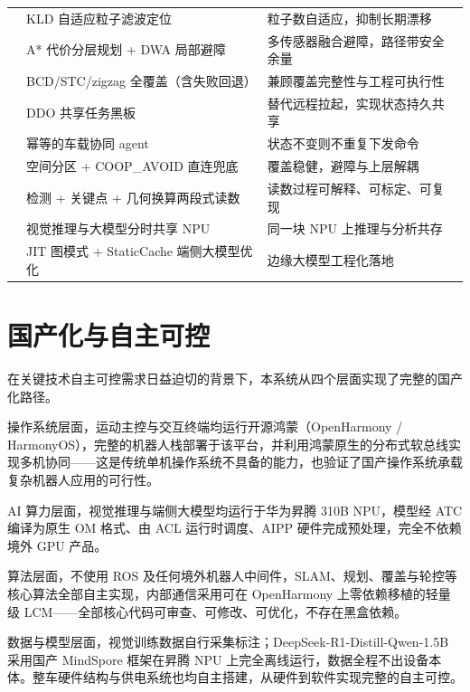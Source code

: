 \begin{xltabular}{\textwidth}{p{2.5cm}p{4.5cm}X}
  & KLD 自适应粒子滤波定位 & 粒子数自适应，抑制长期漂移 \\
  & A* 代价分层规划 + DWA 局部避障 & 多传感器融合避障，路径带安全余量 \\
  & BCD/STC/zigzag 全覆盖（含失败回退） & 兼顾覆盖完整性与工程可执行性 \\
\midrule
{}
  & DDO 共享任务黑板 & 替代远程拉起，实现状态持久共享 \\
  & 幂等的车载协同 agent & 状态不变则不重复下发命令 \\
  & 空间分区 + COOP\_AVOID 直连兜底 & 覆盖稳健，避障与上层解耦 \\
\midrule
{}
  & 检测 + 关键点 + 几何换算两段式读数 & 读数过程可解释、可标定、可复现 \\
  & 视觉推理与大模型分时共享 NPU & 同一块 NPU 上推理与分析共存 \\
  & JIT 图模式 + StaticCache 端侧大模型优化 & 边缘大模型工程化落地 \\
\bottomrule
\end{xltabular}
\normalsize

\section{国产化与自主可控}
\label{sec:domestic-innovation}

在关键技术自主可控需求日益迫切的背景下，本系统从四个层面实现了完整的国产化路径。

操作系统层面，运动主控与交互终端均运行开源鸿蒙（OpenHarmony / HarmonyOS），完整的机器人栈部署于该平台，并利用鸿蒙原生的分布式软总线实现多机协同——这是传统单机操作系统不具备的能力，也验证了国产操作系统承载复杂机器人应用的可行性。

AI 算力层面，视觉推理与端侧大模型均运行于华为昇腾 310B NPU，模型经 ATC 编译为原生 OM 格式、由 ACL 运行时调度、AIPP 硬件完成预处理，完全不依赖境外 GPU 产品。

算法层面，不使用 ROS 及任何境外机器人中间件，SLAM、规划、覆盖与轮控等核心算法全部自主实现，内部通信采用可在 OpenHarmony 上零依赖移植的轻量级 LCM——全部核心代码可审查、可修改、可优化，不存在黑盒依赖。

数据与模型层面，视觉训练数据自行采集标注；DeepSeek-R1-Distill-Qwen-1.5B 采用国产 MindSpore 框架在昇腾 NPU 上完全离线运行，数据全程不出设备本体。整车硬件结构与供电系统也均自主搭建，从硬件到软件实现完整的自主可控。

